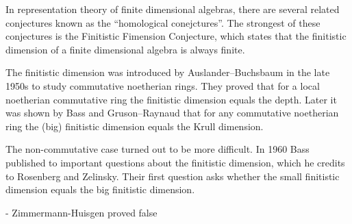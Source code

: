 In representation theory of finite dimensional algebras, there are several related conjectures known as the ``homological conejctures''. The strongest of these conjectures is the Finitistic Fimension Conjecture, which states that the finitistic dimension of a finite dimensional algebra is always finite.

The finitistic dimension was introduced by Auslander--Buchsbaum in the late 1950s to study commutative noetherian rings. They proved that for a local noetherian commutative ring the finitistic dimension equals the depth\cite{AB57}. Later it was shown by Bass and Gruson--Raynaud that for any commutative noetherian ring the (big) finitistic dimension equals the Krull dimension\cite{Bass62,RG71}.

The non-commutative case turned out to be more difficult. In 1960 Bass published to important questions about the finitistic dimension\cite{Bass60}, which he credits to Rosenberg and Zelinsky. Their first question asks whether the small finitistic dimension equals the big finitistic dimension. 

- Zimmermann-Huisgen proved false \cite{ZH92}

